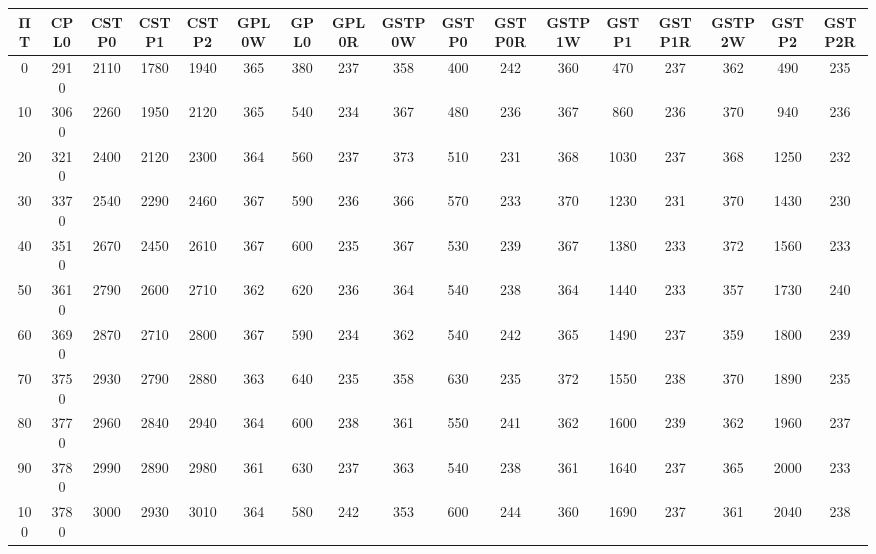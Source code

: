 \begin{tabular}{|c|c|c|c|c|c|c|c|c|c|c|c|c|c|c|c|c|}
\hline
ΠΤ&CPL0&CSTP0&CSTP1&CSTP2&GPL0W&GPL0&GPL0R&GSTP0W&GSTP0&GSTP0R&GSTP1W&GSTP1&GSTP1R&GSTP2W&GSTP2&GSTP2R\\\hline
\hline
0&2910&2110&1780&1940&365&380&237&358&400&242&360&470&237&362&490&235\\
\hline
10&3060&2260&1950&2120&365&540&234&367&480&236&367&860&236&370&940&236\\
\hline
20&3210&2400&2120&2300&364&560&237&373&510&231&368&1030&237&368&1250&232\\
\hline
30&3370&2540&2290&2460&367&590&236&366&570&233&370&1230&231&370&1430&230\\
\hline
40&3510&2670&2450&2610&367&600&235&367&530&239&367&1380&233&372&1560&233\\
\hline
50&3610&2790&2600&2710&362&620&236&364&540&238&364&1440&233&357&1730&240\\
\hline
60&3690&2870&2710&2800&367&590&234&362&540&242&365&1490&237&359&1800&239\\
\hline
70&3750&2930&2790&2880&363&640&235&358&630&235&372&1550&238&370&1890&235\\
\hline
80&3770&2960&2840&2940&364&600&238&361&550&241&362&1600&239&362&1960&237\\
\hline
90&3780&2990&2890&2980&361&630&237&363&540&238&361&1640&237&365&2000&233\\
\hline
100&3780&3000&2930&3010&364&580&242&353&600&244&360&1690&237&361&2040&238\\
\hline
\end{tabular}

